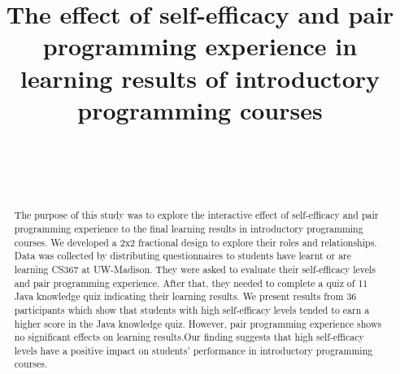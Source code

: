 \documentclass{sigchi}
\def\plaintitle{ The effect of self-efficacy and pair programming experience in learning results of introductory programming courses}
\begin{document}
\title{\plaintitle}

\author{%
  \\
  \\
  \\
}

\maketitle

\begin{abstract}


The purpose of this study was to explore the interactive effect of self-efficacy and pair programming experience to the final learning results in introductory programming courses. We developed a 2x2 fractional design to explore their roles and relationships. Data was collected by distributing questionnaires to students have learnt or are learning CS367 at UW-Madison. They were asked to evaluate their self-efficacy levels and pair programming experience. After that, they needed to complete a quiz of 11 Java knowledge quiz indicating their learning results. We present results from 36 participants which show that students with high self-efficacy levels tended to earn a higher score in the Java knowledge quiz.  However, pair programming experience shows no significant effects on learning results.Our finding suggests that high self-efficacy levels have a positive impact on students' performance in introductory programming courses.

\end{abstract}

\end{document}
